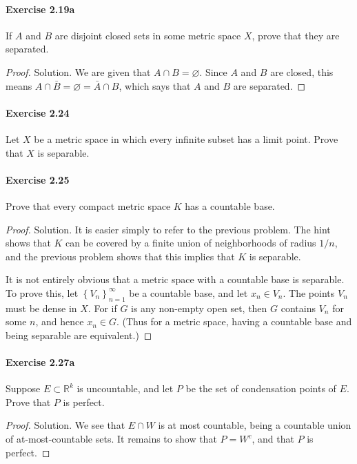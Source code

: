 \documentclass{article}
\theoremstyle{definition}
\begin{document}
\paragraph{Exercise 2.19a} If $A$ and $B$ are disjoint closed sets in some metric space $X$, prove that they are separated.
\begin{proof}
    Solution. We are given that $A \cap B=\varnothing$. Since $A$ and $B$ are closed, this means $A \cap \bar{B}=\varnothing=\bar{A} \cap B$, which says that $A$ and $B$ are separated.
\end{proof}


\paragraph{Exercise 2.24} Let $X$ be a metric space in which every infinite subset has a limit point. Prove that $X$ is separable.

\paragraph{Exercise 2.25} Prove that every compact metric space $K$ has a countable base.
\begin{proof}
    Solution. It is easier simply to refer to the previous problem. The hint shows that $K$ can be covered by a finite union of neighborhoods of radius $1 / n$, and the previous problem shows that this implies that $K$ is separable.

It is not entirely obvious that a metric space with a countable base is separable. To prove this, let $\left\{V_n\right\}_{n=1}^{\infty}$ be a countable base, and let $x_n \in V_n$. The points $V_n$ must be dense in $X$. For if $G$ is any non-empty open set, then $G$ contains $V_n$ for some $n$, and hence $x_n \in G$. (Thus for a metric space, having a countable base and being separable are equivalent.)
\end{proof}


\paragraph{Exercise 2.27a} Suppose $E\subset\mathbb{R}^k$ is uncountable, and let $P$ be the set of condensation points of $E$. Prove that $P$ is perfect.
\begin{proof}
    Solution. We see that $E \cap W$ is at most countable, being a countable union of at-most-countable sets. It remains to show that $P=W^c$, and that $P$ is perfect.
\end{proof}
\end{document}
